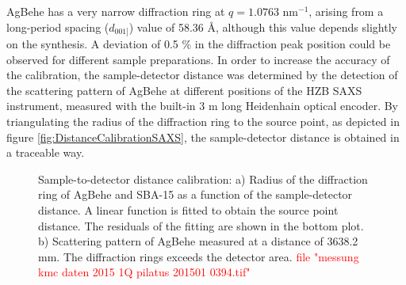 AgBehe has a very narrow diffraction ring at $q=1.0763$ nm$^{-1}$, arising from a long-period spacing ($d_{001]}$) value of 58.36 \AA \citep{blanton_jcpdsinternational_1995}, although this value depends slightly on the synthesis. A deviation of 0.5 $\%$ in the diffraction peak position could be observed for different sample preparations. In order to increase the accuracy of the calibration, the sample-detector distance was determined by the detection of the scattering pattern of AgBehe at different positions of the HZB SAXS instrument, measured with the built-in 3 m long Heidenhain optical encoder. By triangulating the radius of the diffraction ring to the source point, as depicted in figure \ref{fig:DistanceCalibrationSAXS}, the sample-detector distance is obtained in a traceable way.

\begin{figure}
	\centering
		\caption{Sample-to-detector distance calibration: a) Radius of the diffraction ring of AgBehe and SBA-15 as a function of the sample-detector distance. A linear function is fitted to obtain the source point distance. The residuals of the fitting are shown in the bottom plot. b) Scattering pattern of AgBehe measured at a distance of 3638.2 mm. The diffraction rings exceeds the detector area. \textcolor{red}{file "messung kmc daten 2015 1Q pilatus 201501 0394.tif"}}
\end{figure}

